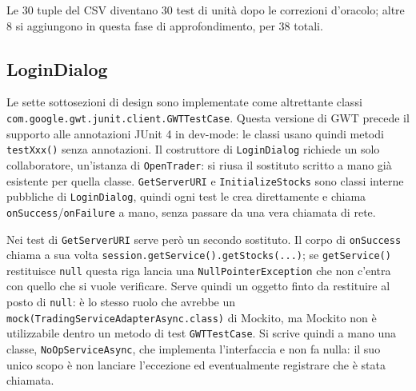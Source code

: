 Le 30 tuple del CSV diventano 30 test di unità dopo le correzioni d'oracolo; altre 8 si
aggiungono in questa fase di approfondimento, per 38 totali.

\subsection{LoginDialog}

Le sette sottosezioni di design sono implementate come altrettante classi
\texttt{com.google.gwt.junit.client.GWTTestCase}. Questa versione di GWT precede il supporto
alle annotazioni JUnit 4 in dev-mode: le classi usano quindi metodi \texttt{testXxx()} senza
annotazioni. Il costruttore di \texttt{LoginDialog} richiede un solo collaboratore, un'istanza
di \texttt{OpenTrader}: si riusa il sostituto scritto a mano già esistente per quella classe.
\texttt{GetServerURI} e \texttt{InitializeStocks} sono classi interne pubbliche di
\texttt{LoginDialog}, quindi ogni test le crea direttamente e chiama \texttt{onSuccess}/\texttt{onFailure} a mano,
senza passare da una vera chiamata di rete.

Nei test di \texttt{GetServerURI} serve però un secondo sostituto. Il corpo di
\texttt{onSuccess} chiama a sua volta \texttt{session.getService().getStocks(...)}; se
\texttt{getService()} restituisce \texttt{null} questa riga lancia una \texttt{NullPointerException} che non c'entra con quello che si vuole
verificare. Serve quindi un oggetto finto da restituire al posto di \texttt{null}: è lo stesso
ruolo che avrebbe un \texttt{mock(TradingServiceAdapterAsync.class)} di Mockito, ma Mockito non
è utilizzabile dentro un metodo di test \texttt{GWTTestCase}. Si scrive quindi a mano una classe,
\texttt{NoOpServiceAsync}, che implementa l'interfaccia e non fa nulla: il suo unico scopo è
non lanciare l'eccezione ed eventualmente registrare che è stata chiamata.

